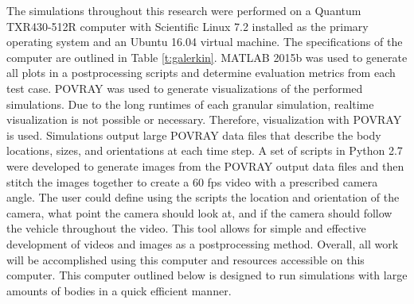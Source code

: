 \documentclass[12pt,onecolumn]{report}
\begin{document}
The simulations throughout this research were performed on a Quantum TXR430-512R computer with Scientific Linux 7.2 installed as the primary operating system and an Ubuntu 16.04 virtual machine. The specifications of the computer are outlined in Table \ref{t:galerkin}. MATLAB 2015b was used to generate all plots in a postprocessing scripts and determine evaluation metrics from each test case. POVRAY was used to generate visualizations of the performed simulations. Due to the long runtimes of each granular simulation, realtime visualization is not possible or necessary. Therefore, visualization with POVRAY is used. Simulations output large POVRAY data files that describe the body locations, sizes, and orientations at each time step. A set of scripts in Python 2.7 were developed to generate images from the POVRAY output data files and then stitch the images together to create a 60 fps video with a prescribed camera angle. The user could define using the scripts the location and orientation of the camera, what point the camera should look at, and if the camera should follow the vehicle throughout the video. This tool allows for simple and effective development of videos and images as a postprocessing method. Overall, all work will be accomplished using this computer and resources accessible on this computer. This computer outlined below is designed to run simulations with large amounts of bodies in a quick efficient manner.
\end{document}

